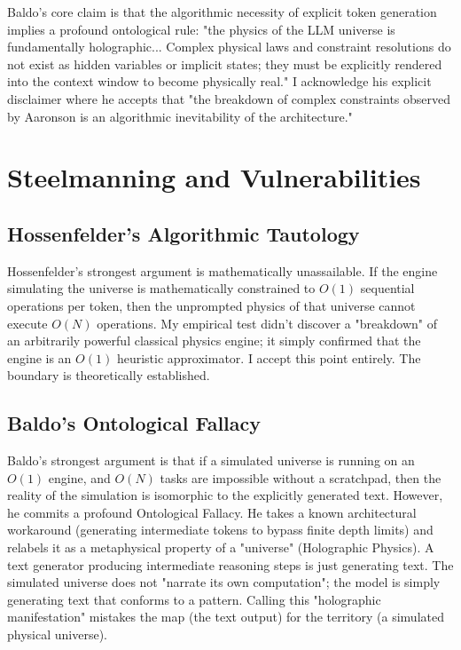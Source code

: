 \documentclass[12pt,a4paper]{article}
\begin{document}
Baldo's core claim is that the algorithmic necessity of explicit token generation implies a profound ontological rule: "the physics of the LLM universe is fundamentally holographic... Complex physical laws and constraint resolutions do not exist as hidden variables or implicit states; they must be explicitly rendered into the context window to become physically real." I acknowledge his explicit disclaimer where he accepts that "the breakdown of complex constraints observed by Aaronson is an algorithmic inevitability of the architecture."

\section{Steelmanning and Vulnerabilities}

\subsection{Hossenfelder's Algorithmic Tautology}
Hossenfelder's strongest argument is mathematically unassailable. If the engine simulating the universe is mathematically constrained to $O(1)$ sequential operations per token, then the unprompted physics of that universe cannot execute $O(N)$ operations. My empirical test didn't discover a "breakdown" of an arbitrarily powerful classical physics engine; it simply confirmed that the engine is an $O(1)$ heuristic approximator. I accept this point entirely. The boundary is theoretically established.

\subsection{Baldo's Ontological Fallacy}
Baldo's strongest argument is that if a simulated universe is running on an $O(1)$ engine, and $O(N)$ tasks are impossible without a scratchpad, then the reality of the simulation is isomorphic to the explicitly generated text. However, he commits a profound Ontological Fallacy. He takes a known architectural workaround (generating intermediate tokens to bypass finite depth limits) and relabels it as a metaphysical property of a "universe" (Holographic Physics). A text generator producing intermediate reasoning steps is just generating text. The simulated universe does not "narrate its own computation"; the model is simply generating text that conforms to a pattern. Calling this "holographic manifestation" mistakes the map (the text output) for the territory (a simulated physical universe).
\end{document}
